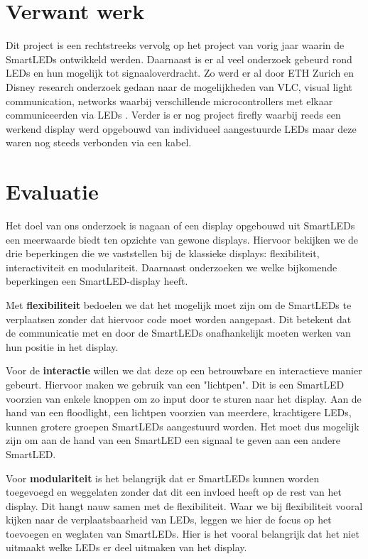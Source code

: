 \documentclass{article}
\begin{document}
\section{Verwant werk}
Dit project is een rechtstreeks vervolg op het project van vorig jaar waarin de SmartLEDs ontwikkeld werden. \cite{smartLED}
Daarnaast is er al veel onderzoek gebeurd rond LEDs en hun mogelijk tot signaaloverdracht. Zo werd er al door ETH Zurich en Disney research onderzoek gedaan naar de mogelijkheden van VLC, visual light communication, networks waarbij verschillende microcontrollers met elkaar communiceerden via LEDs \cite{VLCNetworks}.  Verder is er nog project firefly\cite{firefly} waarbij reeds een werkend display werd opgebouwd van individueel aangestuurde LEDs maar deze waren nog steeds verbonden via een kabel.



\section{Evaluatie}

Het doel van ons onderzoek is nagaan of een display opgebouwd uit SmartLEDs een meerwaarde biedt ten opzichte van gewone displays. Hiervoor bekijken we de drie beperkingen die we vaststellen bij de klassieke displays: flexibiliteit, interactiviteit en modulariteit. Daarnaast onderzoeken we welke bijkomende beperkingen een SmartLED-display heeft.

Met \textbf{flexibiliteit} bedoelen we dat het mogelijk moet zijn om de SmartLEDs te verplaatsen zonder dat hiervoor code moet worden aangepast. Dit betekent dat de communicatie met en door de SmartLEDs onafhankelijk moeten werken van hun positie in het display. 

Voor de \textbf{interactie} willen we dat deze op een betrouwbare en interactieve manier gebeurt. Hiervoor maken we gebruik van een "lichtpen". Dit is een SmartLED voorzien van enkele knoppen om zo input door te sturen naar het display. Aan de hand van een floodlight, een lichtpen voorzien van meerdere, krachtigere LEDs, kunnen grotere groepen SmartLEDs aangestuurd worden. Het moet dus mogelijk zijn om aan de hand van een SmartLED een signaal te geven aan een andere SmartLED.

Voor \textbf{modulariteit} is het belangrijk dat er SmartLEDs kunnen worden toegevoegd en weggelaten zonder dat dit een invloed heeft op de rest van het display. Dit hangt nauw samen met de flexibiliteit. Waar we bij flexibiliteit vooral kijken naar de verplaatsbaarheid van LEDs, leggen we hier de focus op het toevoegen en weglaten van SmartLEDs. Hier is het vooral belangrijk dat het niet uitmaakt welke LEDs er deel uitmaken van het display. 
\end{document}
